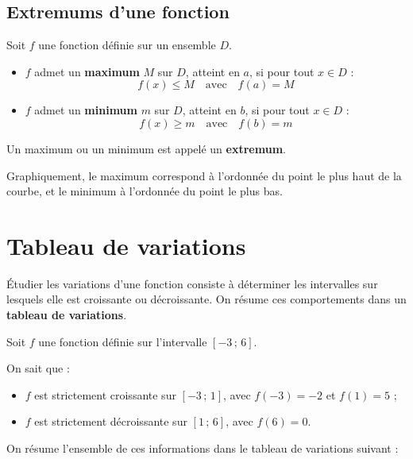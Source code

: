 \subsection{Extremums d'une fonction}

\begin{defin}
	Soit $f$ une fonction définie sur un ensemble $D$.
	\begin{itemize}
		\item $f$ admet un \textbf{maximum} $M$ sur $D$, atteint en $a$, si pour tout $x \in D$ :
		      \[
			      f(x) \le M \quad \text{avec} \quad f(a) = M
		      \]
		\item $f$ admet un \textbf{minimum} $m$ sur $D$, atteint en $b$, si pour tout $x \in D$ :
		      \[
			      f(x) \ge m \quad \text{avec} \quad f(b) = m
		      \]
	\end{itemize}
	Un maximum ou un minimum est appelé un \textbf{extremum}.
\end{defin}

\begin{rem}
	Graphiquement, le maximum correspond à l'ordonnée du point le plus haut de la courbe, et le minimum à l'ordonnée du point le plus bas.
\end{rem}

\section{Tableau de variations}

\begin{defin}
	Étudier les variations d'une fonction consiste à déterminer les intervalles sur lesquels elle est croissante ou décroissante. On résume ces comportements dans un \textbf{tableau de variations}.
\end{defin}

\begin{ex}
	Soit $f$ une fonction définie sur l'intervalle $[-3 \,;\, 6]$.

	On sait que :
	\begin{itemize}
		\item $f$ est strictement croissante sur $[-3 \,;\, 1]$, avec $f(-3) = -2$ et $f(1) = 5$ ;
		\item $f$ est strictement décroissante sur $[1 \,;\, 6]$, avec $f(6) = 0$.
	\end{itemize}

	On résume l'ensemble de ces informations dans le tableau de variations suivant :

	\begin{center}
	\end{center}
\end{ex}

